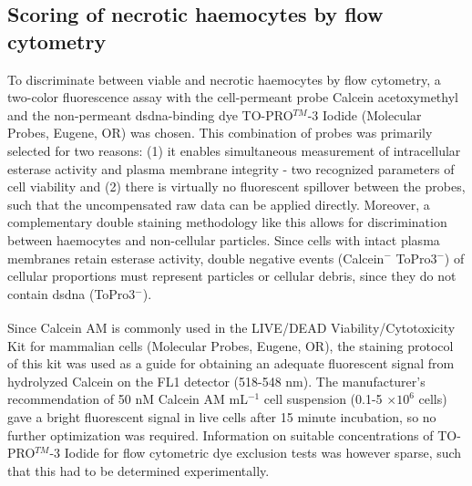\subsection{Scoring of necrotic haemocytes by flow cytometry}
To discriminate between viable and necrotic haemocytes by flow cytometry, a two-color fluorescence assay with the cell-permeant probe Calcein acetoxymethyl and the non-permeant \acrshort{dsdna}-binding dye TO-PRO$^{TM}$-3 Iodide (Molecular Probes, Eugene, OR) was chosen. This combination of probes was primarily selected for two reasons: (1) it enables simultaneous measurement of intracellular esterase activity and plasma membrane integrity - two recognized parameters of cell viability and (2) there is virtually no fluorescent spillover between the probes, such that the uncompensated raw data can be applied directly. Moreover, a complementary double staining methodology like this allows for discrimination between haemocytes and non-cellular particles. Since cells with intact plasma membranes retain esterase activity, double negative events (Calcein$^{-}$ ToPro3$^{-}$) of cellular proportions  must represent particles or cellular debris, since they do not contain \acrshort{dsdna} (ToPro3$^{-}$). 

Since Calcein AM is commonly used in the LIVE/DEAD\textsuperscript{\textregistered} Viability/Cytotoxicity Kit for mammalian cells (Molecular Probes, Eugene, OR), the staining protocol of this kit was used as a guide for obtaining an adequate fluorescent signal from hydrolyzed Calcein on the FL1 detector (518-548 nm). The manufacturer's recommendation of 50 nM Calcein AM mL$^{-1}$ cell suspension (0.1-5 $\times 10^{6}$ cells) gave a bright fluorescent signal in live cells after 15 minute incubation, so no further optimization was required. Information on suitable concentrations of TO-PRO$^{TM}$-3 Iodide for flow cytometric dye exclusion tests was however sparse, such that this had to be determined experimentally.

